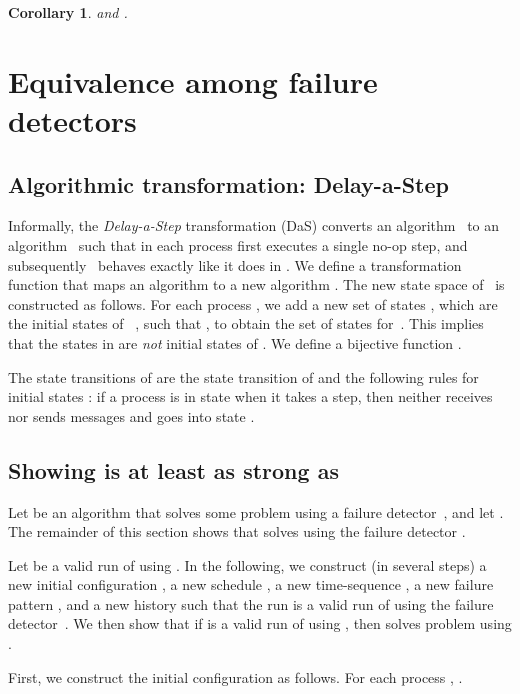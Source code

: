 \documentclass[11pt]{article}
\newtheorem{corollary}[proposition]{Corollary}
\begin{document}
\begin{corollary}
 and .
\end{corollary}

\section{Equivalence among  failure detectors}
\label{sec:DK}


\subsection{Algorithmic transformation: Delay-a-Step}
\label{subsubsec:atdas}

Informally, the \emph{Delay-a-Step} transformation (DaS) converts an
     algorithm~ to an algorithm~ such that in 
     each process  first executes a single no-op step, and
     subsequently~ behaves exactly like it does in .
We define a transformation function  that maps an
     algorithm    to a new
     algorithm .
The new state space of~ is constructed as follows.
For each process , we add a new set of states , which are the initial states of ~, such
     that , to obtain the set of states
     for~.
This implies that the states in  are \emph{not} initial
     states of .
We define a bijective function .


The state transitions of  are the state transition of 
     and the following rules for initial states : if a
     process  is in state  when it takes a step,
     then  neither receives nor sends messages and goes into
     state .




\subsection{Showing  is at least as strong as }

Let  be an algorithm that solves some problem  using a
     failure detector~, and let .
The remainder of this section  shows that  solves 
     using the failure detector .

Let  be a
     valid run of  using .
In the following, we construct (in several steps)  a new initial
     configuration , a new schedule , a new time-sequence
     , a new failure pattern , and a new history  such that
     the run  is a valid run of
      using the failure detector~.
We then show that if  is a valid run of  using , then
      solves problem  using .


First, we construct the initial configuration  as follows.
For each process , .
\end{document}
